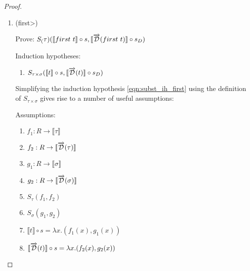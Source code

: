 \documentclass[11pt, final]{article}
\begin{document}
\begin{proof}
\begin{enumerate}
\begin{align*}
        & \Vdash \text{(Give witnesses of $S_\tau$ and $S_\sigma$ using respective IHs \ref{eqn:subst_ih_tuple1} and \ref{eqn:subst_ih_tuple2})} \\
        & \;\;\;\;\lambda x. (\llbracket t_1 \rrbracket(s(x)), \llbracket t_2 \rrbracket(s(x))) \\
        & \;\;\;\;\;\;\; = \lambda x. (\llbracket t_1 \rrbracket(s(x)), \llbracket t_2 \rrbracket(s(x))) \wedge \\
        & \;\;\;\;\lambda x. (\llbracket \D(t_1) \rrbracket(s'(x)), \llbracket \D(t_2) \rrbracket(s'(x))) \\
        & \;\;\;\;\;\;\; = \lambda x. (\llbracket \D(t_1) \rrbracket(s'(x)), \llbracket \D(t_2) \rrbracket(s'(x))) \\
        & \Vdash \text{(Reflexivity)} \\
      \end{align*}\qed
      \item (\<first>)

      Prove: $S_(\tau)(\llbracket first\ t \rrbracket \circ s, \llbracket \overrightarrow{\mathcal{D}}(first\ t) \rrbracket \circ s_D)$

      Induction hypotheses:
      \begin{enumerate}
        \item \label{eqn:subst_ih_first}$S_{\tau\times\sigma}(\llbracket t \rrbracket \circ s, \llbracket \overrightarrow{\mathcal{D}}(t) \rrbracket \circ s_D)$
      \end{enumerate}

      Simplifying the induction hypothesis \ref{eqn:subst_ih_first} using the definition of $S_{\tau\times\sigma}$ gives rise to a number of useful assumptions:

      Assumptions:
      \begin{enumerate}
        \item \label{eqn:subst_ass_proj1_0} $f_1 : R \rightarrow \llbracket \tau \rrbracket$
        \item \label{eqn:subst_ass_proj1_1} $f_2 : R \rightarrow \llbracket \overrightarrow{\mathcal{D}}(\tau) \rrbracket$
        \item \label{eqn:subst_ass_proj1_2} $g_1 : R \rightarrow \llbracket \sigma \rrbracket$
        \item \label{eqn:subst_ass_proj1_3} $g_2 : R \rightarrow \llbracket \overrightarrow{\mathcal{D}}(\sigma) \rrbracket$
        \item \label{eqn:subst_ass_proj1_4} $S_\tau(f_1, f_2)$
        \item \label{eqn:subst_ass_proj1_5} $S_\sigma(g_1, g_2)$
        \item \label{eqn:subst_ass_proj1_6} $\llbracket t \rrbracket \circ s = \lambda x. (f_1(x), g_1(x))$
        \item \label{eqn:subst_ass_proj1_7} $\llbracket \overrightarrow{\mathcal{D}}(t) \rrbracket \circ s = \lambda x. (f_2(x), g_2(x))$
      \end{enumerate}


\end{enumerate}
\end{proof}
\end{document}
